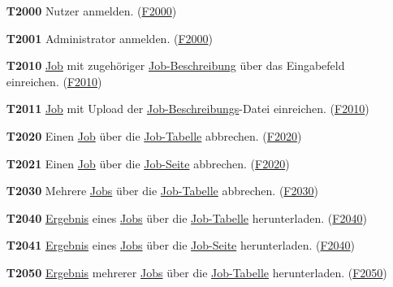 \begin{itemize}
    \item[\textbf{T2000}] \gls{Nutzer} anmelden. (\hyperref[FA:Web-Interface:Anmelden]{F2000})
    
    \item[\textbf{T2001}] \gls{Administrator} anmelden. (\hyperref[FA:Web-Interface:Anmelden]{F2000})
    
    \item[\textbf{T2010}] \hyperref[B:Jobs]{Job} mit zugehöriger \hyperref[B:Job-Beschreibung]{Job-Beschreibung} über das Eingabefeld einreichen. (\hyperref[FA:Web-Interface:Job einreichen]{F2010})
    
    \item[\textbf{T2011}] \hyperref[B:Jobs]{Job} mit Upload der \hyperref[B:Job-Beschreibung]{Job-Beschreibungs}-Datei einreichen. (\hyperref[FA:Web-Interface:Job einreichen]{F2010})
    
    \item[\textbf{T2020}] Einen \hyperref[B:Jobs]{Job} über die \hyperref[pages:job-table]{Job-Tabelle} abbrechen. (\hyperref[FA:Web-Interface:Abbruch eines einzelnen Jobs]{F2020})
    
    \item[\textbf{T2021}] Einen \hyperref[B:Jobs]{Job} über die \hyperref[pages:job-page]{Job-Seite} abbrechen. (\hyperref[FA:Web-Interface:Abbruch eines einzelnen Jobs]{F2020})
    
    \item[\textbf{T2030}] Mehrere \hyperref[B:Jobs]{Jobs} über die \hyperref[pages:job-table]{Job-Tabelle} abbrechen. (\hyperref[FA:Web-Interface:Abbruch mehrerer Jobs auf einmal]{F2030})
    
    \item[\textbf{T2040}] \hyperref[B:Job-Ergebnis]{Ergebnis} eines \hyperref[B:Jobs]{Jobs} über die \hyperref[pages:job-table]{Job-Tabelle} herunterladen. (\hyperref[FA:Web-Interface:Herunterladen eines einzelnen Ergebnisses]{F2040})
    
    \item[\textbf{T2041}] \hyperref[B:Job-Ergebnis]{Ergebnis} eines \hyperref[B:Jobs]{Jobs} über die \hyperref[pages:job-page]{Job-Seite} herunterladen. (\hyperref[FA:Web-Interface:Herunterladen eines einzelnen Ergebnisses]{F2040})
    
    \item[\textbf{T2050}] \hyperref[B:Job-Ergebnis]{Ergebnis} mehrerer \hyperref[B:Jobs]{Jobs} über die \hyperref[pages:job-table]{Job-Tabelle} herunterladen. (\hyperref[FA:Web-Interface:herunterladen mehrerer Ergebnisse auf einmal]{F2050})
    

\end{itemize}
